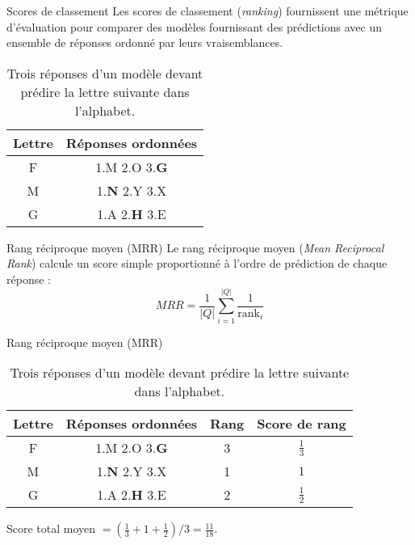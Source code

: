 \begin{frame}{Scores de classement}
  Les scores de classement (\emph{ranking}) fournissent une métrique d'évaluation pour comparer des modèles fournissant des prédictions avec un ensemble de réponses ordonné par leurs vraisemblances.
  \vfill
  \begin{table}
    \centering
    \begin{tabular}{c|c}
      \toprule
      Lettre & Réponses ordonnées\\
      \midrule
      F & 1.M 2.O 3.\textbf{G}\\
      M & 1.\textbf{N} 2.Y 3.X\\
      G & 1.A 2.\textbf{H} 3.E\\
      \bottomrule
    \end{tabular}
    \caption{Trois réponses d'un modèle devant prédire la lettre suivante dans l'alphabet.}
  \end{table}
\end{frame}

\begin{frame}{Rang réciproque moyen (MRR)}
  Le rang réciproque moyen (\emph{Mean Reciprocal Rank}) calcule un score simple proportionné à l'ordre de prédiction de chaque réponse :
  \begin{equation*}
    MRR = \frac{1}{|Q|}\sum_{i=1}^{|Q|}\frac{1}{\text{rank}_i}
  \end{equation*}
\end{frame}

\begin{frame}{Rang réciproque moyen (MRR)}
  \begin{table}
    \centering
    \begin{tabular}{c|c|c|c}
      \toprule
      Lettre & Réponses ordonnées & Rang & Score de rang\\
      \midrule
      F & 1.M 2.O 3.\textbf{G} & 3 & $\frac{1}{3}$\\
      M & 1.\textbf{N} 2.Y 3.X & 1 & $1$\\
      G & 1.A 2.\textbf{H} 3.E & 2 & $\frac{1}{2}$\\
      \bottomrule
    \end{tabular}
    \caption{Trois réponses d'un modèle devant prédire la lettre suivante dans l'alphabet.}
  \end{table}
  Score total moyen $= (\frac{1}{3}+1+\frac{1}{2})/3=\frac{11}{18}$.
\end{frame}

